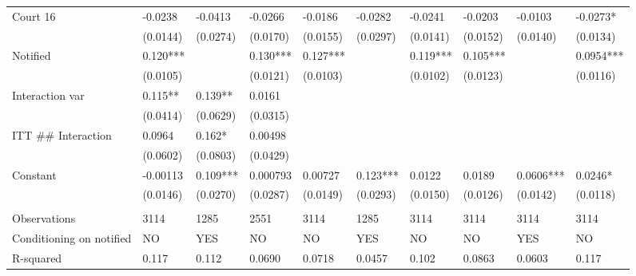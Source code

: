 \begin{tabular}{llllllllll}
Court 16 & -0.0238 & -0.0413 & -0.0266 & -0.0186 & -0.0282 & -0.0241 & -0.0203 & -0.0103 & -0.0273* \\
      & (0.0144) & (0.0274) & (0.0170) & (0.0155) & (0.0297) & (0.0141) & (0.0152) & (0.0140) & (0.0134) \\
Notified & 0.120*** &       & 0.130*** & 0.127*** &       & 0.119*** & 0.105*** &       & 0.0954*** \\
      & (0.0105) &       & (0.0121) & (0.0103) &       & (0.0102) & (0.0123) &       & (0.0116) \\
Interaction var & 0.115** & 0.139** & 0.0161 &       &       &       &       &       &  \\
      & (0.0414) & (0.0629) & (0.0315) &       &       &       &       &       &  \\
ITT \#\# Interaction & 0.0964 & 0.162* & 0.00498 &       &       &       &       &       &  \\
      & (0.0602) & (0.0803) & (0.0429) &       &       &       &       &       &  \\
Constant & -0.00113 & 0.109*** & 0.000793 & 0.00727 & 0.123*** & 0.0122 & 0.0189 & 0.0606*** & 0.0246* \\
      & (0.0146) & (0.0270) & (0.0287) & (0.0149) & (0.0293) & (0.0150) & (0.0126) & (0.0142) & (0.0118) \\
      &       &       &       &       &       &       &       &       &  \\
\midrule
Observations & 3114  & 1285  & 2551  & 3114  & 1285  & 3114  & 3114  & 3114  & 3114 \\
Conditioning on notified & NO    & YES   & NO    & NO    & YES   & NO    & NO    & YES   & NO \\
R-squared & 0.117 & 0.112 & 0.0690 & 0.0718 & 0.0457 & 0.102 & 0.0863 & 0.0603 & 0.117 \\
\bottomrule
\bottomrule
\end{tabular}%
